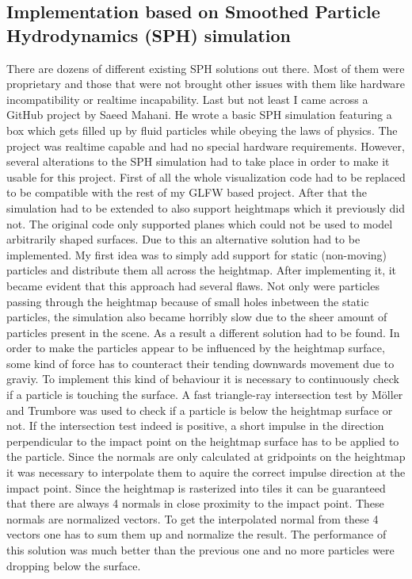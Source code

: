 \documentclass[11pt,a4paper,twoside,openright]{report}
\begin{document}
\subsection{Implementation based on Smoothed Particle Hydrodynamics (SPH) simulation}
There are dozens of different existing SPH solutions out there. Most of them were proprietary and those that were not brought other issues with them like hardware incompatibility or realtime incapability. Last but not least I came across a GitHub project by Saeed Mahani. He wrote a basic SPH simulation featuring a box which gets filled up by fluid particles while obeying the laws of physics. The project was realtime capable and had no special hardware requirements. However, several alterations to the SPH simulation had to take place in order to make it usable for this project. First of all the whole visualization code had to be replaced to be compatible with the rest of my GLFW based project. After that the simulation had to be extended to also support heightmaps which it previously did not. The original code only supported planes which could not be used to model arbitrarily shaped surfaces. Due to this an alternative solution had to be implemented. My first idea was to simply add support for static (non-moving) particles and distribute them all across the heightmap. After implementing it, it became evident that this approach had several flaws. Not only were particles passing through the heightmap because of small holes inbetween the static particles, the simulation also became horribly slow due to the sheer amount of particles present in the scene. As a result a different solution had to be found. In order to make the particles appear to be influenced by the heightmap surface, some kind of force has to counteract their tending downwards movement due to graviy. To implement this kind of behaviour it is necessary to continuously check if a particle is touching the surface. A fast triangle-ray intersection test by Möller and Trumbore \cite{moller2005fast} was used to check if a particle is below the heightmap surface or not. If the intersection test indeed is positive, a short impulse in the direction perpendicular to the impact point on the heightmap surface has to be applied to the particle. Since the normals are only calculated at gridpoints on the heightmap it was necessary to interpolate them to aquire the correct impulse direction at the impact point. Since the heightmap is rasterized into tiles it can be guaranteed that there are always 4 normals in close proximity to the impact point. These normals are normalized vectors. To get the interpolated normal from these 4 vectors one has to sum them up and normalize the result. The performance of this solution was much better than the previous one and no more particles were dropping below the surface.
\end{document}
